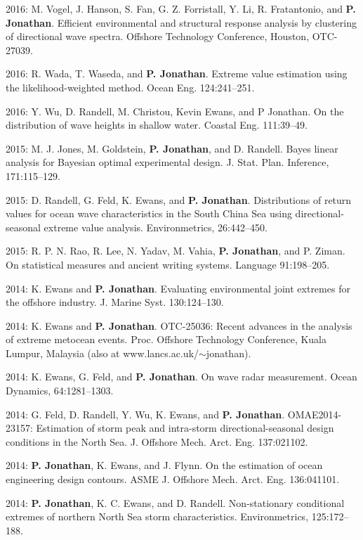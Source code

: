 \documentclass[11pt,a4paper]{moderncv}
\begin{document}
2016: M. Vogel, J. Hanson, S. Fan, G. Z. Forristall, Y. Li, R. Fratantonio, and \textbf{P. Jonathan}. Efficient environmental and structural response analysis by clustering of directional wave spectra. Offshore Technology Conference, Houston, OTC-27039.

2016: R. Wada, T. Waseda, and \textbf{P. Jonathan}. Extreme value estimation using the likelihood-weighted method. Ocean Eng. 124:241--251.

2016: Y. Wu, D. Randell, M. Christou, Kevin Ewans, and P Jonathan. On the distribution of wave heights in shallow water. Coastal Eng. 111:39--49.

2015: M. J. Jones, M. Goldstein, \textbf{P. Jonathan}, and D. Randell. Bayes linear analysis for Bayesian optimal experimental design. J. Stat. Plan. Inference, 171:115--129.

2015: D. Randell, G. Feld, K. Ewans, and \textbf{P. Jonathan}. Distributions of return values for ocean wave characteristics in the South China Sea using directional-seasonal extreme value analysis. Environmetrics, 26:442--450.

2015: R. P. N. Rao, R. Lee, N. Yadav, M. Vahia, \textbf{P. Jonathan}, and P. Ziman. On statistical measures and ancient writing systems. Language 91:198--205.

2014: K. Ewans and \textbf{P. Jonathan}. Evaluating environmental joint extremes for the offshore industry. J. Marine Syst. 130:124--130.

2014: K. Ewans and \textbf{P. Jonathan}. OTC-25036: Recent advances in the analysis of extreme metocean events. Proc. Offshore Technology Conference, Kuala Lumpur, Malaysia (also at www.lancs.ac.uk/$\sim$jonathan). 

2014: K. Ewans, G. Feld, and \textbf{P. Jonathan}. On wave radar measurement. Ocean Dynamics, 64:1281--1303. 

2014: G. Feld, D. Randell, Y. Wu, K. Ewans, and \textbf{P. Jonathan}. OMAE2014-23157: Estimation of storm peak and intra-storm directional-seasonal design conditions in the North Sea. J. Offshore Mech. Arct. Eng. 137:021102.

2014: \textbf{P. Jonathan}, K. Ewans, and J. Flynn. On the estimation of ocean engineering design contours. ASME J. Offshore Mech. Arct. Eng. 136:041101.

2014: \textbf{P. Jonathan}, K. C. Ewans, and D. Randell. Non-stationary conditional extremes of northern North Sea storm characteristics. Environmetrics, 125:172--188.
\end{document}
